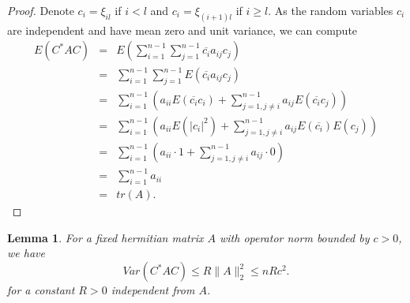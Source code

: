 \documentclass[12pt,a4paper,leqno]{report}
\theoremstyle{plain}
\newtheorem{lem}[equation]{Lemma}
\theoremstyle{definition}
\theoremstyle{remark}
\begin{document}
\begin{proof}
Denote $c_i = \xi_{il}$ if $i<l$ and $c_i = \xi_{(i+1)l}$ if $i\geq l$.
As the random variables $c_i$ are independent and have mean zero and unit variance, we can compute
\begin{eqnarray*}
E(C^* A C) & = & E(\sum_{i=1}^{n-1} \sum_{j=1}^{n-1} \overline{c_i} a_{ij} c_j)\\
& = & \sum_{i=1}^{n-1} \sum_{j=1}^{n-1} E(\overline{c_i} a_{ij} c_j)\\
& = & \sum_{i=1}^{n-1} (a_{ii} E(\overline{c_i}c_i) + \sum_{j=1,j \neq i}^{n-1} a_{ij} E(\overline{c_i} c_j))\\
& = & \sum_{i=1}^{n-1} (a_{ii} E(|c_i|^2 ) + \sum_{j=1,j \neq i}^{n-1} a_{ij} E(\overline{c_i}) E(c_j))\\
& = & \sum_{i=1}^{n-1} (a_{ii} \cdot 1 + \sum_{j=1,j \neq i}^{n-1} a_{ij} \cdot 0)\\
& = & \sum_{i=1}^{n-1} a_{ii}\\
& = & tr(A).
\end{eqnarray*} 
\end{proof}

\begin{lem}
For a fixed hermitian matrix $A$ with operator norm bounded by $c>0$, we have
\begin{equation*}
Var(C^* A C) \leq R \| A \|_2^2 \leq n R c^2.
\end{equation*}
for a constant $R>0$ independent from $A$.
\end{lem}
\end{document}
